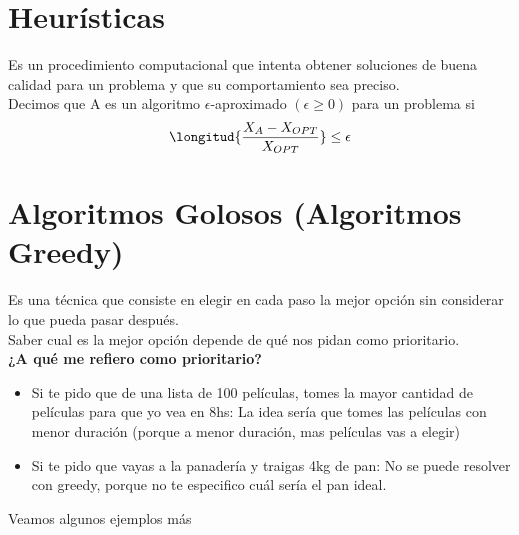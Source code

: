 \documentclass[10pt,a4paper]{article}
\begin{document}
\section*{Heurísticas}
Es un procedimiento computacional que intenta obtener soluciones de buena calidad para un problema y que su comportamiento sea preciso. \\
Decimos que A es un algoritmo $\epsilon$-aproximado $(\epsilon \ge 0)$ para un problema si \[\longitud{\frac{X_{A} - X_{OPT}}{X_{OPT}}} \le \epsilon\]
\section*{Algoritmos Golosos (Algoritmos Greedy)}
Es una técnica que consiste en elegir en cada paso la mejor opción sin considerar lo que pueda pasar después. \\
Saber cual es la mejor opción depende de qué nos pidan como prioritario. \\
\textbf{¿A qué me refiero como prioritario?}
\begin{itemize}
    \item Si te pido que de una lista de 100 películas, tomes la mayor cantidad de películas para que yo vea en 8hs: La idea sería que tomes las películas con menor duración (porque a menor duración, mas películas vas a elegir)
    \item Si te pido que vayas a la panadería y traigas 4kg de pan: No se puede resolver con greedy, porque no te especifico cuál sería el pan ideal.
\end{itemize}
Veamos algunos ejemplos más
\end{document}
